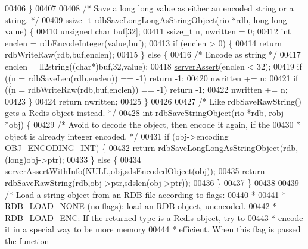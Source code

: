 \begin{DoxyCode}
{{{{{00406 \}
00407 
00408 \textcolor{comment}{/* Save a long long value as either an encoded string or a string. */}
00409 ssize\_t rdbSaveLongLongAsStringObject(rio *rdb, \textcolor{keywordtype}{long} \textcolor{keywordtype}{long} value) \{
00410     \textcolor{keywordtype}{unsigned} \textcolor{keywordtype}{char} buf[32];
00411     ssize\_t n, nwritten = 0;
00412     \textcolor{keywordtype}{int} enclen = rdbEncodeInteger(value,buf);
00413     \textcolor{keywordflow}{if} (enclen > 0) \{
00414         \textcolor{keywordflow}{return} rdbWriteRaw(rdb,buf,enclen);
00415     \} \textcolor{keywordflow}{else} \{
00416         \textcolor{comment}{/* Encode as string */}
00417         enclen = ll2string((\textcolor{keywordtype}{char}*)buf,32,value);
00418         \hyperlink{server_8h_a88114b5169b4c382df6b56506285e56a}{serverAssert}(enclen < 32);
00419         \textcolor{keywordflow}{if} ((n = rdbSaveLen(rdb,enclen)) == -1) \textcolor{keywordflow}{return} -1;
00420         nwritten += n;
00421         \textcolor{keywordflow}{if} ((n = rdbWriteRaw(rdb,buf,enclen)) == -1) \textcolor{keywordflow}{return} -1;
00422         nwritten += n;
00423     \}
00424     \textcolor{keywordflow}{return} nwritten;
00425 \}
00426 
00427 \textcolor{comment}{/* Like rdbSaveRawString() gets a Redis object instead. */}
00428 \textcolor{keywordtype}{int} rdbSaveStringObject(rio *rdb, robj *obj) \{
00429     \textcolor{comment}{/* Avoid to decode the object, then encode it again, if the}
00430 \textcolor{comment}{     * object is already integer encoded. */}
00431     \textcolor{keywordflow}{if} (obj->encoding == \hyperlink{server_8h_ae934cf008a0be0ef009c92c2d006a816}{OBJ\_ENCODING\_INT}) \{
00432         \textcolor{keywordflow}{return} rdbSaveLongLongAsStringObject(rdb,(\textcolor{keywordtype}{long})obj->ptr);
00433     \} \textcolor{keywordflow}{else} \{
00434         \hyperlink{server_8h_a7308f76cbff9a8d3797fe78190b91282}{serverAssertWithInfo}(NULL,obj,\hyperlink{server_8h_afcfb5bd97af52d1dbce331745cae030c}{sdsEncodedObject}(obj));
00435         \textcolor{keywordflow}{return} rdbSaveRawString(rdb,obj->ptr,sdslen(obj->ptr));
00436     \}
00437 \}
00438 
00439 \textcolor{comment}{/* Load a string object from an RDB file according to flags:}
00440 \textcolor{comment}{ *}
00441 \textcolor{comment}{ * RDB\_LOAD\_NONE (no flags): load an RDB object, unencoded.}
00442 \textcolor{comment}{ * RDB\_LOAD\_ENC: If the returned type is a Redis object, try to}
00443 \textcolor{comment}{ *               encode it in a special way to be more memory}
00444 \textcolor{comment}{ *               efficient. When this flag is passed the function}
}}}}}
\end{DoxyCode}
